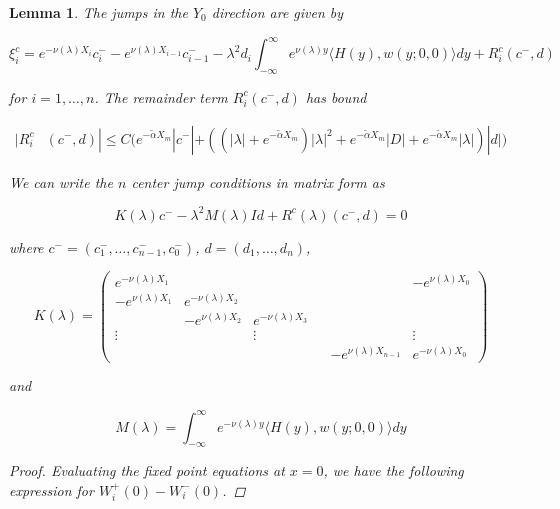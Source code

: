 \documentclass[12pt]{article}
\newtheorem{lemma}{Lemma}
\begin{document}
\begin{lemma}

The jumps in the $Y_0$ direction are given by 

\begin{equation}
\xi^c_i 
= e^{-\nu(\lambda)X_i} c_i^- - e^{\nu(\lambda)X_{i-1}} c_{i-1}^- - \lambda^2 d_i \int_{-\infty}^\infty e^{\nu(\lambda)y}  \langle H(y), w(y; 0, 0) \rangle dy + R^c_i(c^-,d)
\end{equation}

for $i = 1, \dots, n$. The remainder term $R^c_i(c^-,d)$ has bound

\begin{align}
|R^c_i&(c^-,d)| \leq C \Big( e^{-\tilde{\alpha} X_m} |c^-| + ((|\lambda| + e^{-\tilde{\alpha} X_m})|\lambda|^2 + e^{-\tilde{\alpha} X_m}|D| + e^{-\tilde{\alpha} X_m} |\lambda| ) |d| \Big)
\end{align}

We can write the $n$ center jump conditions in matrix form as

\begin{equation}
K(\lambda)c^- -\lambda^2 M(\lambda) I d + R^c(\lambda)(c^-,d) = 0
\end{equation}

where $c^- = (c_1^-, \dots, c_{n-1}^-, c_0^-)$, $d = (d_1, \dots, d_n)$, 

\begin{equation}
K(\lambda) = 
\begin{pmatrix}
e^{-\nu(\lambda)X_1} & & & & & -e^{\nu(\lambda)X_0} \\
-e^{\nu(\lambda)X_1} & e^{-\nu(\lambda)X_2} \\
& -e^{\nu(\lambda)X_2} & e^{-\nu(\lambda)X_3} \\
\vdots & & \vdots & &&  \vdots \\
& & & & -e^{\nu(\lambda)X_{n-1}} & e^{-\nu(\lambda)X_0} 
\end{pmatrix}
\end{equation}

and

\begin{equation}
M(\lambda) = \int_{-\infty}^\infty e^{-\nu(\lambda)y} \langle H(y), w(y; 0, 0) \rangle dy
\end{equation}

\begin{proof}

Evaluating the fixed point equations at $x = 0$, we have the following expression for $W_i^+(0) - W_i^-(0)$.


\end{proof}
\end{lemma}
\end{document}
